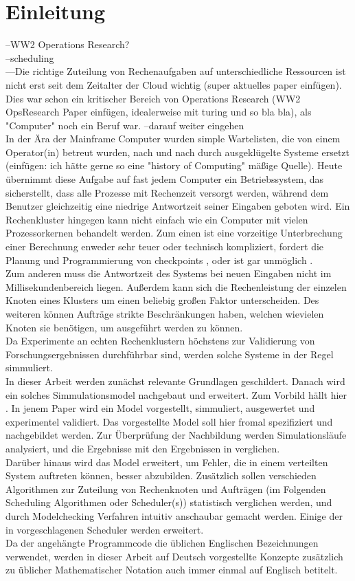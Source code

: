 \chapter{Einleitung}
\label{chap:ein}


--WW2 Operations Research?\\
--scheduling\\
---Die richtige Zuteilung von Rechenaufgaben auf unterschiedliche Ressourcen ist nicht erst seit dem Zeitalter der Cloud wichtig (super aktuelles paper einfügen). Dies war schon ein kritischer Bereich von Operations Research (WW2 OpsResearch Paper einfügen, idealerweise mit turing und so bla bla), als "Computer" noch ein Beruf war.
--darauf weiter eingehen\\

In der Ära der Mainframe Computer wurden simple Wartelisten, die von einem Operator(in) betreut wurden, nach und nach durch ausgeklügelte Systeme ersetzt (einfügen: ich hätte gerne so eine "history of Computing" mäßige Quelle). Heute übernimmt diese Aufgabe auf fast jedem Computer ein Betriebssystem, das sicherstellt, dass alle Prozesse mit Rechenzeit versorgt werden, während dem Benutzer gleichzeitig eine niedrige Antwortzeit seiner Eingaben geboten wird. Ein Rechenkluster hingegen kann nicht einfach wie ein Computer mit vielen Prozessorkernen behandelt werden. Zum einen ist eine vorzeitige Unterbrechung einer Berechnung enweder sehr teuer oder technisch kompliziert, fordert die Planung und Programmierung von checkpoints \cite{IPS15}, oder ist gar unmöglich \cite{adams1979hitchhiker}.\\
Zum anderen muss die Antwortzeit des Systems bei neuen Eingaben nicht im Millisekundenbereich liegen. Außerdem kann sich die Rechenleistung der einzelen Knoten eines Klusters um einen beliebig großen Faktor unterscheiden.  Des weiteren können Aufträge strikte Beschränkungen haben, welchen wievielen Knoten sie benötigen, um ausgeführt werden zu können.\\
Da Experimente an echten Rechenklustern höchstens zur Validierung von Forschungsergebnissen durchführbar sind, werden solche Systeme in der Regel simmuliert.\\
In dieser Arbeit werden zunächst relevante Grundlagen geschildert.
Danach wird ein solches Simmulationsmodel nachgebaut und erweitert. Zum Vorbild hällt hier \cite{Arn99}. In jenem Paper wird ein Model vorgestellt, simmuliert, ausgewertet und experimentel validiert. Das vorgestellte Model soll hier fromal spezifiziert und nachgebildet werden. Zur Überprüfung der Nachbildung werden Simulationsläufe analysiert, und die Ergebnisse mit den Ergebnissen in \cite{Arn99} verglichen.\\
Darüber hinaus wird das Model erweitert, um Fehler, die in einem verteilten System auftreten können, besser abzubilden.
Zusätzlich sollen verschieden Algorithmen zur Zuteilung von Rechenknoten und Aufträgen (im Folgenden Scheduling Algorithmen oder Scheduler(s)) statistisch verglichen werden, und durch Modelchecking Verfahren intuitiv anschaubar gemacht werden. Einige der in \cite{Arn99} vorgeschlagenen Scheduler werden erweitert.\\


Da der angehängte Programmcode die üblichen Englischen Bezeichnungen verwendet, werden in dieser Arbeit auf Deutsch vorgestellte Konzepte zusätzlich zu üblicher Mathematischer Notation auch immer einmal auf Englisch betitelt.


